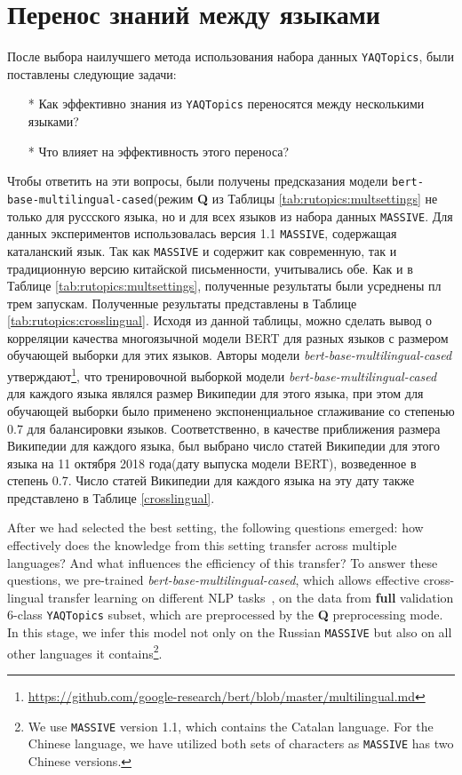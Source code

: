 \section{Перенос знаний между языками}
После выбора наилучшего метода использования набора данных \texttt{YAQTopics}, были поставлены следующие задачи:
\begin{itemize}
\item[*]Как эффективно знания из \texttt{YAQTopics} переносятся между несколькими языками?
\item[*]Что влияет на эффективность этого переноса?
\end{itemize}
Чтобы ответить на эти вопросы, были получены предсказания модели \texttt{bert-base-multilingual-cased}(режим \textbf{Q} из Таблицы \ref{tab:rutopics:multsettings} не только для руссского языка, но и для всех языков из набора данных \texttt{MASSIVE}. Для данных экспериментов использовалась версия 1.1 \texttt{MASSIVE}, содержащая каталанский язык. Так как \texttt{MASSIVE} и содержит как современную, так и традиционную версию китайской письменности, учитывались обе. Как и в Таблице \ref{tab:rutopics:multsettings}, полученные результаты были усреднены пл трем запускам.
Полученные результаты представлены в Таблице \ref{tab:rutopics:crosslingual}. Исходя из данной таблицы, можно сделать вывод о корреляции качества многоязычной модели BERT для разных языков с размером обучающей выборки для этих языков. Авторы модели \textit{bert-base-multilingual-cased} утверждают\footnote{\url{https://github.com/google-research/bert/blob/master/multilingual.md}}, что тренировочной выборкой модели \textit{bert-base-multilingual-cased} для каждого языка являлся размер Википедии для этого языка, при этом для обучающей выборки было применено экспоненциальное сглаживание со степенью 0.7 для балансировки языков.
Соответственно, в качестве приближения размера Википедии для каждого языка, был выбрано число статей Википедии для этого языка на 11 октября 2018 года(дату выпуска модели BERT), возведенное в степень 0.7.  Число статей Википедии для каждого языка на эту дату также представлено в Таблице \ref{crosslingual}.


After we had selected the best setting, the following questions emerged: how effectively does the knowledge from this setting transfer across multiple languages? And what influences the efficiency of this transfer? To answer these questions, we pre-trained \textit{bert-base-multilingual-cased}, which allows effective cross-lingual transfer learning on different NLP tasks~\cite{ner,squad}, on the data from \textbf{full} validation 6-class \texttt{YAQTopics} subset, which are preprocessed by the \textbf{Q} preprocessing mode. In this stage, we infer this model not only on the Russian \texttt{MASSIVE} but also on all other languages it contains\footnote{We use \texttt{MASSIVE} version 1.1, which contains the Catalan language. For the Chinese language, we have utilized both sets of characters as \texttt{MASSIVE} has two Chinese versions.}.

